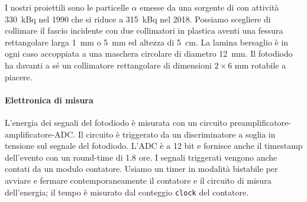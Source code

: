 I nostri proiettili sono le particelle $\alpha$ emesse da una sorgente di \am{} con attività \SI{330}{kBq} nel 1990 che si riduce a \SI{315}{kBq} nel 2018.
Possiamo scegliere di collimare il fascio incidente con due collimatori in plastica aventi una fessura rettangolare larga \SI{1}{mm} o \SI{5}{mm} ed altezza di \SI{5}{cm}.
La lamina bersaglio è in ogni caso accoppiata a una maschera circolare di diametro \SI{12}{mm}.
Il fotodiodo ha davanti a sé un collimatore rettangolare di dimensioni $2\times 6$\! mm rotabile a piacere.

\paragraph{Elettronica di misura}

L'energia dei segnali del fotodiodo è misurata con un circuito preamplificatore-amplificatore-ADC.
Il circuito è triggerato da un discriminatore a soglia in tensione sul segnale del fotodiodo.
L'ADC è a 12 bit e fornisce anche il timestamp dell'evento con un round-time di 1.8 ore.
I segnali triggerati vengono anche contati da un modulo contatore.
Usiamo un timer in modalità bistabile per avviare e fermare contemporaneamente
il contatore e il circuito di misura dell'energia; il tempo è misurato dal conteggio \texttt{clock} del contatore. 
